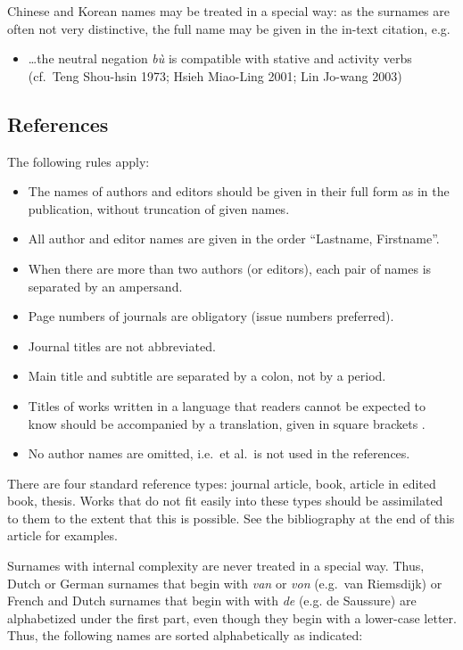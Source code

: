 \documentclass[]{glossa}
\providecommand{\tightlist}{%
  \setlength{\itemsep}{0pt}\setlength{\parskip}{0pt}}
\begin{document}
Chinese and Korean names may be treated in a special way: as the
surnames are often not very distinctive, the full name may be given in
the in-text citation, e.g.

\begin{itemize}
\tightlist
\item
  \ldots the neutral negation \emph{bù} is compatible with stative and
  activity verbs (cf.~Teng Shou-hsin 1973; Hsieh Miao-Ling 2001; Lin
  Jo-wang 2003)
\end{itemize}

\hypertarget{sec:refs}{%
\subsection{References}\label{sec:refs}}

The following rules apply:

\begin{itemize}
\item
  The names of authors and editors should be given in their full form as
  in the publication, without truncation of given names.
\item
  All author and editor names are given in the order ``Lastname,
  Firstname''.
\item
  When there are more than two authors (or editors), each pair of names
  is separated by an ampersand.
\item
  Page numbers of journals are obligatory (issue numbers preferred).
\item
  Journal titles are not abbreviated.
\item
  Main title and subtitle are separated by a colon, not by a period.
\item
  Titles of works written in a language that readers cannot be expected
  to know should be accompanied by a translation, given in square
  brackets \citep{Li1999}.
\item
  No author names are omitted, i.e.~et al.~is not used in the
  references.
\end{itemize}

There are four standard reference types: journal article, book, article
in edited book, thesis. Works that do not fit easily into these types
should be assimilated to them to the extent that this is possible. See
the bibliography at the end of this article for examples.

Surnames with internal complexity are never treated in a special way.
Thus, Dutch or German surnames that begin with \emph{van} or \emph{von}
(e.g.~van Riemsdijk) or French and Dutch surnames that begin with with
\emph{de} (e.g. de Saussure) are alphabetized under the first part, even
though they begin with a lower-case letter. Thus, the following names
are sorted alphabetically as indicated:
\end{document}
